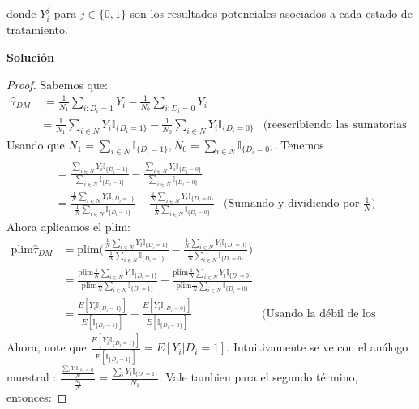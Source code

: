 \documentclass[a4paper, answers, addpoints, 11pt]{exam}
\begin{document}
\begin{itemize}
    donde \(Y^{j}_{i}\) para \(j \in \{0, 1\}\) son los resultados potenciales asociados a cada estado de tratamiento.
     \begin{mdframed}
        \textbf{Solución}
        \begin{proof}
       Sabemos que:
        \begin{align*}
    \widehat{\tau}_{DM} &:= \frac{1}{N_1} \sum_{i: D_i=1} Y_i - \frac{1}{N_0} \sum_{i: D_i=0} Y_i \\&=
  \frac{1}{N_1} \sum_{i \in N} Y_i \mathbb{I}_{\{D_i=1\}} -\frac{1}{N_0} \sum_{i \in N} Y_i \mathbb{I}_{\{D_i=0\}}  &\text{(reescribiendo las sumatorias en términos de N)} 
  \end{align*}
  Usando que $N_1=\sum_{i \in N}  \mathbb{I}_{\{D_i=1\}}, N_0=\sum_{i \in N}  \mathbb{I}_{\{D_i=0\}}$. Tenemos
  \begin{align*}
  \\&=
   \frac{\sum_{i \in N} Y_i \mathbb{I}_{\{D_i=1\}}}{\sum_{i \in N}  \mathbb{I}_{\{D_i=1\}}}  -\frac{\sum_{i \in N} Y_i \mathbb{I}_{\{D_i=0\}}  }{\sum_{i \in N} \mathbb{I}_{\{D_i=0\}}} 
   \\&=
    \frac{\frac{1}{N}\sum_{i \in N} Y_i \mathbb{I}_{\{D_i=1\}}}{\frac{1}{N} \sum_{i \in N}  \mathbb{I}_{\{D_i=1\}}}  -\frac{\frac{1}{N}\sum_{i \in N} Y_i \mathbb{I}_{\{D_i=0\}}  }{\frac{1}{N}\sum_{i \in N} \mathbb{I}_{\{D_i=0\}}} &\text{(Sumando y dividiendo por $\frac{1}{N}$)} 
   \end{align*}
   Ahora aplicamos el plim:
  \begin{align*}
    \text{plim} \widehat{\tau}_{DM}&=  \text{plim} \bigg( \frac{\frac{1}{N}\sum_{i \in N} Y_i \mathbb{I}_{\{D_i=1\}}}{\frac{1}{N} \sum_{i \in N}  \mathbb{I}_{\{D_i=1\}}}  -\frac{\frac{1}{N}\sum_{i \in N} Y_i \mathbb{I}_{\{D_i=0\}}  }{\frac{1}{N}\sum_{i \in N} \mathbb{I}_{\{D_i=0\}}} \bigg) \\&=
     \frac{\text{plim}\frac{1}{N}\sum_{i \in N} Y_i \mathbb{I}_{\{D_i=1\}}}{\text{plim} \frac{1}{N} \sum_{i \in N}  \mathbb{I}_{\{D_i=1\}}}  -\frac{\text{plim}\frac{1}{N}\sum_{i \in N} Y_i \mathbb{I}_{\{D_i=0\}}  }{\text{plim}\frac{1}{N}\sum_{i \in N} \mathbb{I}_{\{D_i=0\}}}  \\&=
     \frac{E[ Y_i \mathbb{I}_{\{D_i=1\}}]}
     {E[\mathbb{I}_{\{D_i=1\}}] }  -\frac{E[ Y_i \mathbb{I}_{\{D_i=0\}}] }{E[\mathbb{I}_{\{D_i=0\}}]} &\text{(Usando la débil de los grandes números)} 
\end{align*}
Ahora, note que $\frac{E[ Y_i \mathbb{I}_{\{D_i=1\}}]}
     {E[\mathbb{I}_{\{D_i=1\}}] }= E[ Y_i| D_i=1]$. Intuitivamente se ve con el análogo muestral : $\frac{\frac{\sum_i Y_i \mathbb{I}_{\{D_i=1\}}}{N}}{\frac{N_1}{N}}=\frac{\sum_i Y_i \mathbb{I}_{\{D_i=1\}}}{N_1}$. Vale tambien para el segundo término, entonces:

\end{proof}
\end{mdframed}
\end{itemize}
\end{document}
